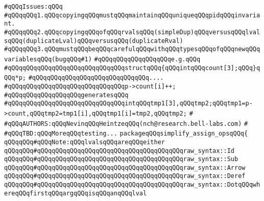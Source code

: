 \verb|#qQQqIssues:qQQq|\newline
\verb|#qQQqqQQq1.qQQqcopyingqQQqmustqQQqmaintainqQQquniqueqQQqpidqQQqinvariant.|\newline
\verb|#qQQqqQQq2.qQQqcopyingqQQqofqQQqrvalsqQQq(simpleDup)qQQqversusqQQqlvalsqQQq(duplicateLval)qQQqversusqQQq(duplicateRval)|\newline
\verb|#qQQqqQQq3.qQQqmustqQQqbeqQQqcarefulqQQqwithqQQqtypesqQQqofqQQqnewqQQqvariablesqQQq(bugqQQq#1)|\newline
\verb|#qQQqqQQqqQQqqQQqqQQqe.g.qQQq|\newline
\verb|#qQQqqQQqqQQqqQQqqQQqqQQqqQQqqQQqstructqQQq{qQQqintqQQqcount[3];qQQq}qQQq*p;|\newline
\verb|#qQQqqQQqqQQqqQQqqQQqqQQqqQQqqQQq....|\newline
\verb|#qQQqqQQqqQQqqQQqqQQqqQQqqQQqqQQqp->count[i]++;|\newline
\verb|#qQQqqQQqqQQqqQQqqQQqgeneratesqQQq|\newline
\verb|#qQQqqQQqqQQqqQQqqQQqqQQqqQQqqQQqintqQQqtmp1[3],qQQqtmp2;qQQqtmp1=p->count,qQQqtmp2=tmp1[i],qQQqtmp1[i]=tmp2,qQQqtmp2;|\newline
\verb|#|\newline
\verb|#qQQqAUTHORS:qQQqNevinqQQqHeintzeqQQq(nch@research.bell-labs.com)|\newline
\verb|#|\newline
\verb|#qQQqTBD:qQQqMoreqQQqtesting...|\newline
\newline
\newline
\newline
\verb|packageqQQqsimplify_assign_opsqQQq{|\newline
\newline
\verb|qQQqqQQq#qQQqNote:qQQqlvalsqQQqareqQQqeither|\newline
\verb|qQQqqQQq#qQQqqQQqqQQqqQQqqQQqqQQqqQQqqQQqqQQqqQQqraw_syntax::Id|\newline
\verb|qQQqqQQq#qQQqqQQqqQQqqQQqqQQqqQQqqQQqqQQqqQQqqQQqraw_syntax::Sub|\newline
\verb|qQQqqQQq#qQQqqQQqqQQqqQQqqQQqqQQqqQQqqQQqqQQqqQQqraw_syntax::Arrow|\newline
\verb|qQQqqQQq#qQQqqQQqqQQqqQQqqQQqqQQqqQQqqQQqqQQqqQQqraw_syntax::Deref|\newline
\verb|qQQqqQQq#qQQqqQQqqQQqqQQqqQQqqQQqqQQqqQQqqQQqqQQqraw_syntax::DotqQQqwhereqQQqfirstqQQqargqQQqisqQQqanqQQqlval|\newline
\newline
